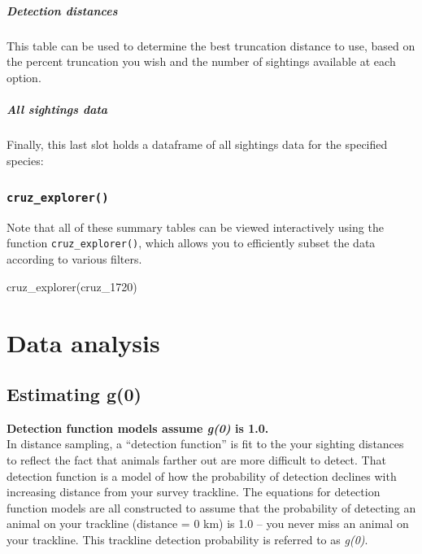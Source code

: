 \documentclass[
]{book}
\newenvironment{Shaded}{\begin{snugshade}}{\end{snugshade}}
\newcommand{\FunctionTok}[1]{\textcolor[rgb]{0.00,0.00,0.00}{#1}}
\newcommand{\NormalTok}[1]{#1}
\begin{document}
\hypertarget{detection-distances}{%
\subsubsection*{Detection distances}\label{detection-distances}}

This table can be used to determine the best truncation distance to use, based on the
percent truncation you wish and the number of sightings available at each option.

\hypertarget{all-sightings-data}{%
\subsubsection*{All sightings data}\label{all-sightings-data}}

Finally, this last slot holds a dataframe of all sightings data for the specified species:

\hypertarget{cruz_explorer}{%
\section*{\texorpdfstring{\texttt{cruz\_explorer()}}{cruz\_explorer()}}\label{cruz_explorer}}

Note that all of these summary tables can be viewed interactively using the function \texttt{cruz\_explorer()},
which allows you to efficiently subset the data according to various filters.

\begin{Shaded}
\begin{Highlighting}[]
\FunctionTok{cruz\_explorer}\NormalTok{(cruz\_1720)}
\end{Highlighting}
\end{Shaded}

\hypertarget{part-data-analysis}{%
\part{Data analysis}\label{part-data-analysis}}

\hypertarget{g0}{%
\chapter{Estimating g(0)}\label{g0}}

\textbf{Detection function models assume \emph{g(0)} is 1.0.}\\
In distance sampling, a ``detection function'' is fit to the your sighting distances to reflect the fact that animals farther out are more difficult to detect. That detection function is a model of how the probability of detection declines with increasing distance from your survey trackline. The equations for detection function models are all constructed to assume that the probability of detecting an animal on your trackline (distance = 0 km) is 1.0 -- you never miss an animal on your trackline. This trackline detection probability is referred to as \emph{g(0)}.
\end{document}
